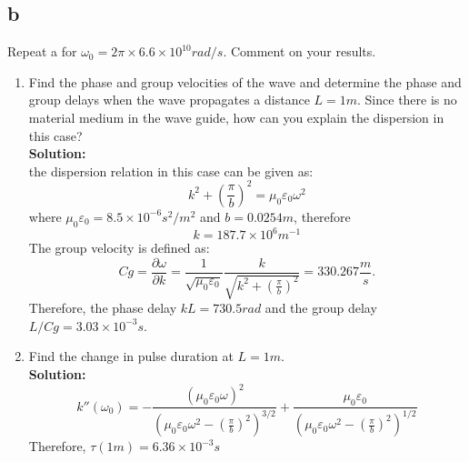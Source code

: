 \documentclass[11pt]{amsart}
\begin{document}
\subsection*{b}
Repeat a for $\omega_0=2 \pi \times 6.6 \times 10^{10} rad/s$. Comment on your results.
\begin{enumerate}
\item Find the phase and group velocities of the wave and determine the phase and group delays when the wave propagates a distance $L=1m$. Since there is no material medium in the wave guide, how can you explain the dispersion in this case?
\\
\textbf{Solution:}\\
the dispersion relation in this case can be given as:
\begin{equation}
k^2+(\frac{\pi}{b})^2=\mu_0 \varepsilon_0 \omega^2
\end{equation}
where $\mu_0 \varepsilon_0=8.5 \times 10^{-6} s^2/m^2$ and $b=0.0254m$, therefore
\begin{equation}
k=187.7\times 10^6 m^{-1}
\end{equation}
The group velocity is defined as:
\begin{equation}
Cg=\frac{\partial \omega}{\partial k}=\frac{1}{\sqrt{\mu_0 \varepsilon_0}}\frac{k}{\sqrt{k^2+(\frac{\pi}{b})^2}}=330.267\frac{m}{s}.
\end{equation}
Therefore, the phase delay $kL=730.5 rad$ and the group delay $L/Cg=3.03\times 10^{-3}s$. 
\item Find the change in pulse duration at $L=1m$.
\\
\textbf{Solution:}\\
\begin{equation}
k''(\omega_0)=-\frac{(\mu_0 \varepsilon_0 \omega)^2}{(\mu_0 \varepsilon_0 \omega^2-(\frac{\pi}{b})^2)^{3/2}}+\frac{\mu_0 \varepsilon_0 }{(\mu_0 \varepsilon_0 \omega^2-(\frac{\pi}{b})^2)^{1/2}}
\end{equation}
Therefore, $\tau(1m)=6.36\times 10^{-3}s$
\end{enumerate}


\end{document}
